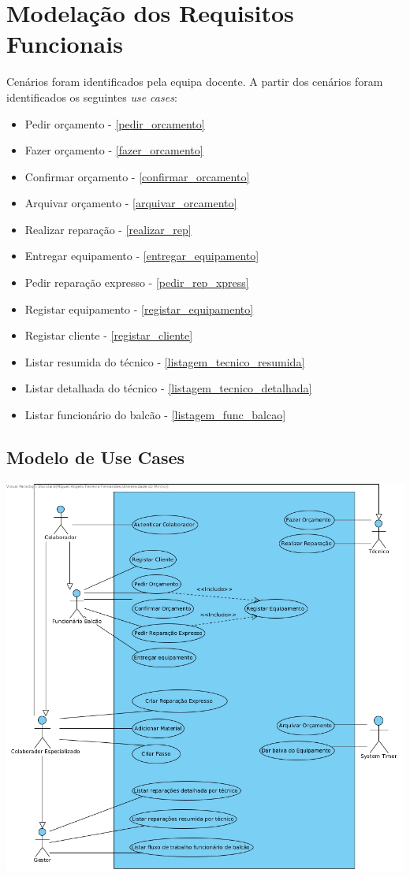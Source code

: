 \documentclass[a4paper, 12pt]{report}
\begin{document}
\section{Modelação dos Requisitos Funcionais}
Cenários foram identificados pela equipa docente.
A partir dos cenários foram identificados os seguintes \textit{use cases}:
\begin{itemize}
        \item Pedir orçamento - \ref{pedir_orcamento}
        \item Fazer orçamento - \ref{fazer_orcamento}
        \item Confirmar orçamento - \ref{confirmar_orcamento}
        \item Arquivar orçamento - \ref{arquivar_orcamento}
        \item Realizar reparação - \ref{realizar_rep}
        \item Entregar equipamento - \ref{entregar_equipamento}
        \item Pedir reparação expresso - \ref{pedir_rep_xpress}
        \item Registar equipamento - \ref{registar_equipamento}
        \item Registar cliente - \ref{registar_cliente}
        \item Listar resumida do técnico - \ref{listagem_tecnico_resumida}
        \item Listar detalhada do técnico - \ref{listagem_tecnico_detalhada}
        \item Listar funcionário do balcão - \ref{listagem_func_balcao}
\end{itemize}
\subsection{Modelo de Use Cases} %

\includegraphics[scale=0.45]{dss-usecase.jpg}
\end{document}
